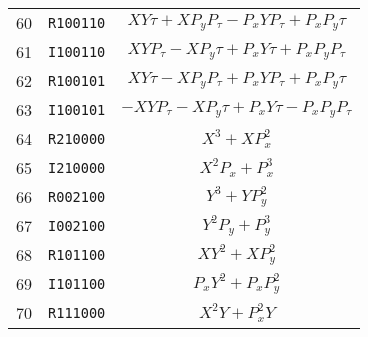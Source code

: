 {{\begin{center}
\begin{tabular}{ccc}
   60&{\tt R100110}&$XY{\tau}+XP_yP_{\tau}-P_xYP_{\tau}+P_xP_y{\tau}$\\
   61&{\tt I100110}&$XYP_{\tau}-XP_y{\tau}+P_xY{\tau}+P_xP_yP_{\tau}$\\
   62&{\tt R100101}&$XY{\tau}-XP_yP_{\tau}+P_xYP_{\tau}+P_xP_y{\tau}$\\
   63&{\tt I100101}&$-XYP_{\tau}-XP_y{\tau}+P_xY{\tau}-P_xP_yP_{\tau}$\\
   64&{\tt R210000}&$X^{3}+XP_x^{2}$\\
   65&{\tt I210000}&$X^{2}P_x+P_x^{3}$\\
   66&{\tt R002100}&$Y^{3}+YP_y^{2}$\\
   67&{\tt I002100}&$Y^{2}P_y+P_y^{3}$\\
   68&{\tt R101100}&$XY^{2}+XP_y^{2}$\\
   69&{\tt I101100}&$P_xY^{2}+P_xP_y^{2}$\\
   70&{\tt R111000}&$X^{2}Y+P_x^{2}Y$
\end{tabular}



\end{center}}}
